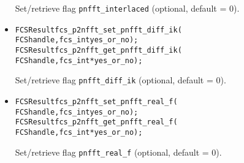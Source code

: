 \begin{itemize}
    Set/retrieve flag \verb!pnfft_interlaced! (optional, default = 0).
  \item
\begin{alltt}
FCSResult fcs_p2nfft_set_pnfft_diff_ik(
    FCS handle, fcs_int yes_or_no);
FCSResult fcs_p2nfft_get_pnfft_diff_ik(
    FCS handle, fcs_int* yes_or_no);
\end{alltt}
    Set/retrieve flag \verb!pnfft_diff_ik! (optional, default = 0).
  \item
\begin{alltt}
FCSResult fcs_p2nfft_set_pnfft_real_f(
    FCS handle, fcs_int yes_or_no);
FCSResult fcs_p2nfft_get_pnfft_real_f(
    FCS handle, fcs_int* yes_or_no);
\end{alltt}
    Set/retrieve flag \verb!pnfft_real_f! (optional, default = 0).
\end{itemize}

